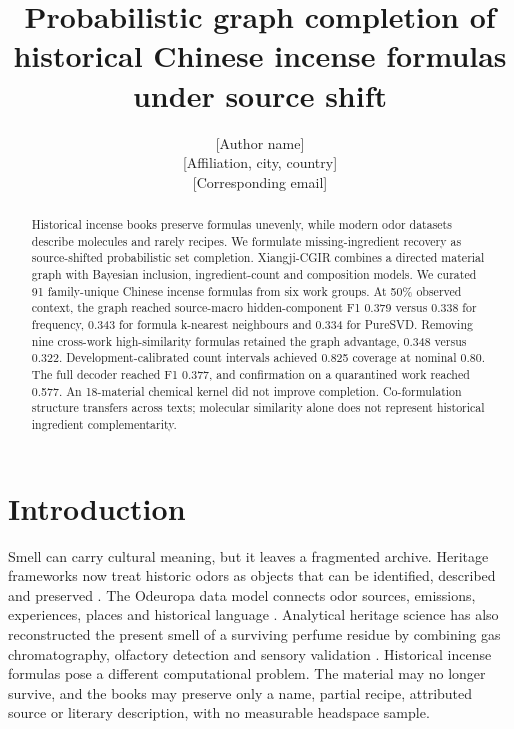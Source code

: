 \documentclass[12pt]{article}
\title{Probabilistic graph completion of historical Chinese incense formulas under source shift}
\author{\colorbox{placeholder}{[Author name]}\\\colorbox{placeholder}{[Affiliation, city, country]}\\\colorbox{placeholder}{[Corresponding email]}}
\date{}
\begin{document}
\maketitle

\linenumbers

\begin{abstract}

Historical incense books preserve formulas unevenly, while modern odor datasets describe molecules and rarely recipes. We formulate missing-ingredient recovery as source-shifted probabilistic set completion. Xiangji-CGIR combines a directed material graph with Bayesian inclusion, ingredient-count and composition models. We curated 91 family-unique Chinese incense formulas from six work groups. At 50\% observed context, the graph reached source-macro hidden-component F1 0.379 versus 0.338 for frequency, 0.343 for formula k-nearest neighbours and 0.334 for PureSVD. Removing nine cross-work high-similarity formulas retained the graph advantage, 0.348 versus 0.322. Development-calibrated count intervals achieved 0.825 coverage at nominal 0.80. The full decoder reached F1 0.377, and confirmation on a quarantined work reached 0.577. An 18-material chemical kernel did not improve completion. Co-formulation structure transfers across texts; molecular similarity alone does not represent historical ingredient complementarity.

\end{abstract}

\section*{Introduction}

Smell can carry cultural meaning, but it leaves a fragmented archive. Heritage frameworks now treat historic odors as objects that can be identified, described and preserved \cite{ref1}. The Odeuropa data model connects odor sources, emissions, experiences, places and historical language \cite{ref2}. Analytical heritage science has also reconstructed the present smell of a surviving perfume residue by combining gas chromatography, olfactory detection and sensory validation \cite{ref3}. Historical incense formulas pose a different computational problem. The material may no longer survive, and the books may preserve only a name, partial recipe, attributed source or literary description, with no measurable headspace sample.
\end{document}
